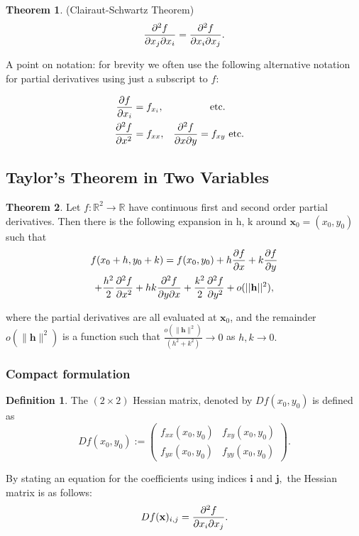 \documentclass[12pt, a4paper]{article}
\newcommand{\bb}[1]{\mathbb{#1}}
\theoremstyle{definition}
\newtheorem{definition}{Definition}[section]
\newtheorem{theorem}{Theorem}[section]
\theoremstyle{plain}
\begin{document}
\begin{theorem}
(Clairaut-Schwartz Theorem) $$\pdv[2]{f}{x_j}{x_i}=\pdv[2]{f}{x_i}{x_j}.$$
\end{theorem}

A point on notation: for brevity we often use the following alternative notation for partial derivatives using just a
subscript to $f:$ 

$$\begin{aligned}
\pdv{f}{x_i}&=f_{x_i}, & \text{ etc.} \\
\pdv[2]{f}{x} &= f_{xx}, & \pdv[2]{f}{x}{y}=f_{xy} & \text{ etc.}
\end{aligned}$$

\subsection{Taylor’s Theorem in Two Variables}

\begin{theorem}
Let $f : \bb{R}^2 \to \bb{R}$ have continuous first and second order partial derivatives. Then there is the following expansion in h, k around $\mathbf{x}_0 = (x_0, y_0)$ such that 
\begin{multline*}
f(x_0 +h,y_0 +k) = f(x_0,y_0)+h\pdv{f}{x}(x_0,y_0)+k\pdv{f}{y}(x_0,y_0) \\
+\frac{h^2}{2}\pdv[2]{f}{x}(x_0,y_0)+hk\pdv[2]{f}{y}{x}(x_0,y_0)+\frac{k^2}{2}\pdv[2]{f}{y}(x_0,y_0) +o(||\mathbf{h}||^2),
\end{multline*}

where the partial derivatives are all evaluated at $\mathbf{x}_0$, and the remainder $o(\|\mathbf{h}\|^2)$ is a function such that $\frac{o(\|\mathbf{h}\|^2)}{(h^2 + k^2)} \to 0$ as $h, k \to 0.$
\end{theorem}

\subsubsection{Compact formulation}

\begin{definition}
The $(2 \times 2)$ Hessian matrix, denoted by $Df(x_0,y_0)$ is defined as $$Df(x_0,y_0):=\begin{pmatrix} f_{xx}(x_0,y_0) & f_{xy}(x_0,y_0) \\ f_{yx}(x_0,y_0) & f_{yy}(x_0,y_0) \end{pmatrix}.$$

By stating an equation for the coefficients using indices $\mathbf{i}$ and $\mathbf{j},$ the Hessian matrix is as follows: $$Df(\mathbf{x})_{i,j}=\pdv[2]{f}{x_i}{x_j}.$$
\end{definition}
\end{document}
